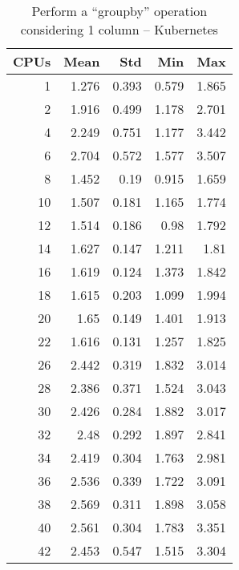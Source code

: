 \begin{table}[htbp]
\begin{minipage}{.45\textwidth}
	\caption{Perform a “groupby” operation considering 1 column -- bare metal}
	\label{tab:baremetal-group-by-operation-df}
  \end{minipage}
  \hfill
  \begin{minipage}{.45\textwidth}
    \centering
    \scriptsize
\begin{tabular}{rrrrr}
\toprule
\textbf{CPUs} & \textbf{Mean} & \textbf{Std} & \textbf{Min} & \textbf{Max} \\
\midrule
1 & 1.276 & 0.393 & 0.579 & 1.865 \\
2 & 1.916 & 0.499 & 1.178 & 2.701 \\
4 & 2.249 & 0.751 & 1.177 & 3.442 \\
6 & 2.704 & 0.572 & 1.577 & 3.507 \\
8 & 1.452 & 0.19 & 0.915 & 1.659 \\
10 & 1.507 & 0.181 & 1.165 & 1.774 \\
12 & 1.514 & 0.186 & 0.98 & 1.792 \\
14 & 1.627 & 0.147 & 1.211 & 1.81 \\
16 & 1.619 & 0.124 & 1.373 & 1.842 \\
18 & 1.615 & 0.203 & 1.099 & 1.994 \\
20 & 1.65 & 0.149 & 1.401 & 1.913 \\
22 & 1.616 & 0.131 & 1.257 & 1.825 \\
26 & 2.442 & 0.319 & 1.832 & 3.014 \\
28 & 2.386 & 0.371 & 1.524 & 3.043 \\
30 & 2.426 & 0.284 & 1.882 & 3.017 \\
32 & 2.48 & 0.292 & 1.897 & 2.841 \\
34 & 2.419 & 0.304 & 1.763 & 2.981 \\
36 & 2.536 & 0.339 & 1.722 & 3.091 \\
38 & 2.569 & 0.311 & 1.898 & 3.058 \\
40 & 2.561 & 0.304 & 1.783 & 3.351 \\
42 & 2.453 & 0.547 & 1.515 & 3.304 \\
\bottomrule
\end{tabular}

	\caption{Perform a “groupby” operation considering 1 column -- Kubernetes}
	\label{tab:kube-group-by-operation-df}
  \end{minipage}
\end{table}


